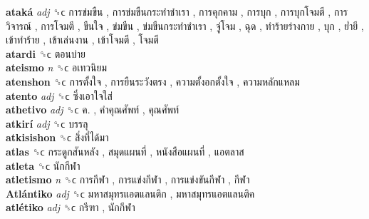 \textbf{ataká} \emph{adj}  ␝ϲ   การข่มขืน ,  การข่มขืนกระทำชำเรา ,  การคุกคาม ,  การบุก ,  การบุกโจมตี ,  การวิจารณ์ ,  การโจมตี ,  ขืนใจ ,  ข่มขืน ,  ข่มขืนกระทำชำเรา ,  จู่โจม ,  ฉุด ,  ทำร้ายร่างกาย ,  บุก ,  ย่ำยี ,  เข้าทำร้าย ,  เข้าเล่นงาน ,  เข้าโจมตี ,  โจมตี   \\
\textbf{atardi} ␝ϲ   ตอนบ่าย   \\
\textbf{ateismo} \emph{n}  ␝ϲ   อเทวนิยม   \\
\textbf{atenshon} ␝ϲ   การตั้งใจ ,  การยืนระวังตรง ,  ความตั้งอกตั้งใจ ,  ความหลักแหลม   \\
\textbf{atento} \emph{adj}  ␝ϲ   ซึ่งเอาใจใส่   \\
\textbf{athetivo} \emph{adj}  ␝ϲ   ค. ,  คำคุณศัพท์ ,  คุณศัพท์   \\
\textbf{atkirí} \emph{adj}  ␝ϲ   บรรลุ   \\
\textbf{atkisishon} ␝ϲ   สิ่งที่ได้มา   \\
\textbf{atlas} ␝ϲ   กระดูกสันหลัง ,  สมุดแผนที่ ,  หนังสือแผนที่ ,  แอตลาส   \\
\textbf{atleta} ␝ϲ   นักกีฬา   \\
\textbf{atletismo} \emph{n}  ␝ϲ   การกีฬา ,  การแข่งกีฬา ,  การแข่งขันกีฬา ,  กีฬา   \\
\textbf{Atlántiko} \emph{adj}  ␝ϲ   มหาสมุทรแอตแลนติก ,  มหาสมุทรแอตแลนติค   \\
\textbf{atlétiko} \emph{adj}  ␝ϲ   กรีฑา ,  นักกีฬา   \\
